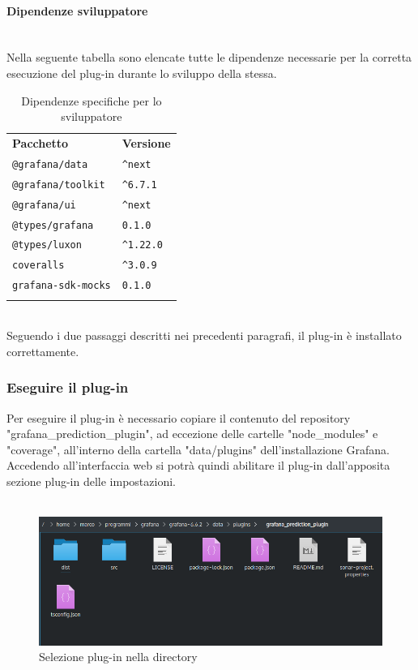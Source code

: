 \paragraph*{Dipendenze sviluppatore}\mbox{}\\ [1mm]
Nella seguente tabella sono elencate tutte le dipendenze necessarie per la corretta esecuzione del plug-in durante lo sviluppo della stessa.
\setcounter{table}{1}
\begin{longtable} {
		>{}p{65mm} 
		>{}p{30mm}
	}
	\rowcolor{gray!50}
	\textbf{Pacchetto} & \textbf{Versione} \TBstrut \\ [2mm]
	\verb|@grafana/data| & \verb|^next| \TBstrut \\ [2mm]
	\verb|@grafana/toolkit| & \verb|^6.7.1| \TBstrut \\ [2mm]
	\verb|@grafana/ui| & \verb|^next| \TBstrut \\ [2mm]
	\verb|@types/grafana| & \verb|0.1.0| \TBstrut \\ [2mm]
	\verb|@types/luxon| & \verb|^1.22.0| \TBstrut \\ [2mm]
	\verb|coveralls| & \verb|^3.0.9| \TBstrut \\ [2mm]
	\verb|grafana-sdk-mocks| & \verb|0.1.0| \TBstrut \\ [2mm]
	\rowcolor{white}
	\caption{Dipendenze specifiche per lo sviluppatore}
\end{longtable}
\mbox{}\\ [1mm]
Seguendo i due passaggi descritti nei precedenti paragrafi, il plug-in è installato correttamente.

\subsubsection{Eseguire il plug-in}%
Per eseguire il plug-in è necessario copiare il contenuto del repository "grafana\_prediction\_plugin", ad eccezione delle cartelle "node\_modules" e "coverage", all'interno della cartella "data/plugins" dell'installazione Grafana\glo. Accedendo all'interfaccia web si potrà quindi abilitare il plug-in dall'apposita sezione plug-in delle impostazioni.
\\
\\
\begin{figure}[H] 	
	\begin{center}
		\includegraphics[width=\textwidth,height=\textheight,keepaspectratio]{img/plugin-directory.png}
	\end{center}
	\caption{Selezione plug-in nella directory}	
\end{figure}

